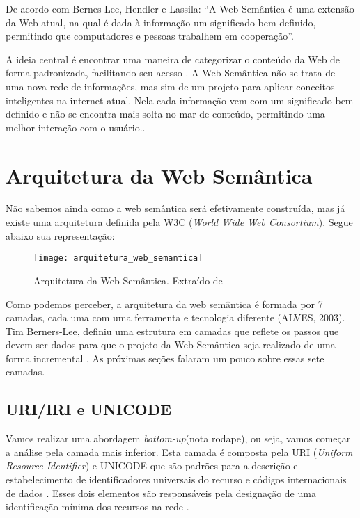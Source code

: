 De acordo com Bernes-Lee, Hendler e Lassila: “A Web Semântica é uma extensão da Web atual, na qual é dada à informação um significado bem definido, permitindo que computadores e pessoas trabalhem em cooperação”.

A ideia central é encontrar uma maneira de categorizar o conteúdo da Web de forma padronizada, facilitando seu acesso \cite{kbreitman}. A Web Semântica não se trata de uma nova rede de informações, mas sim de um projeto para aplicar conceitos inteligentes na internet atual. Nela cada informação vem com um significado bem definido e não se encontra mais solta no mar de conteúdo, permitindo uma melhor interação com o usuário.\cite{websemtecmundo}.


\section{Arquitetura da Web Semântica}

Não sabemos ainda como a web semântica será efetivamente construída, mas já existe uma arquitetura definida pela W3C (\emph{World Wide Web Consortium}). Segue abaixo sua representação:

\graphicspath{{figuras/}}
\begin{figure}[H]
\centering
\texttt{[image: arquitetura\_web\_semantica]}
\caption[Arquitetura da Web Semântica.]{Arquitetura da Web Semântica. Extraído de \cite{fig-arqweb}}
\label{arq_web_sem}
\end{figure}

Como podemos perceber, a arquitetura da web semântica é formada por 7 camadas, cada uma com uma ferramenta e tecnologia diferente (ALVES, 2003). Tim Berners-Lee, definiu uma estrutura em camadas que reflete os passos que devem ser dados para que o projeto da Web Semântica seja realizado de uma forma incremental \cite{ferneda}. As próximas seções falaram um pouco sobre essas sete camadas.

\subsection{URI/IRI e UNICODE}

Vamos realizar uma abordagem \emph{bottom-up}(nota rodape), ou seja, vamos começar a análise pela camada mais inferior. Esta camada é composta pela URI (\emph{Uniform Resource Identifier}) e UNICODE que são padrões para a descrição e estabelecimento de identificadores universais do recurso e códigos internacionais de dados \cite{santarem}. Esses dois elementos são responsáveis pela designação de uma identificação mínima dos recursos na rede \cite{vesu}.

